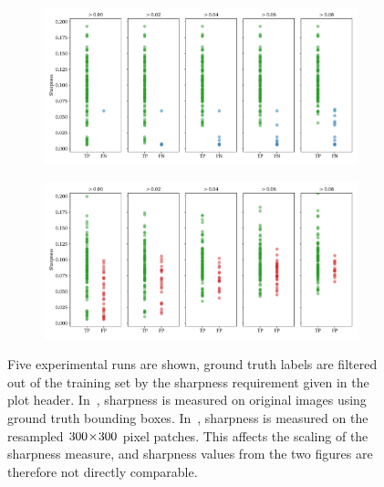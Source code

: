 \begin{figure}[htbp]
  \centering
  \begin{subfigure}[t]{\textwidth}
    \includegraphics[width=\textwidth]{figs/results/sharpness/sharpness_TP_vs_FN.pdf}
    \label{fig:results-sharpness-gt}
  \end{subfigure}
  \begin{subfigure}[t]{\textwidth}
    \includegraphics[width=\textwidth]{figs/results/sharpness/detection_sharpness_TP_vs_FP.pdf}
    \label{fig:results-sharpness-detections}
  \end{subfigure}
  \caption[Sharpness distribution of model predictions in test split by minimum training sharpness]{%
  Five experimental runs are shown, ground truth labels are filtered out of the training set by the sharpness requirement given in the plot header. In~, sharpness is measured on original images using ground truth bounding boxes. In~, sharpness is measured on the resampled \(300\!\times \!300\) pixel patches. This affects the scaling of the sharpness measure, and sharpness values from the two figures are therefore not directly comparable.
  }\label{fig:results-sharpness-minimum}
\end{figure}

